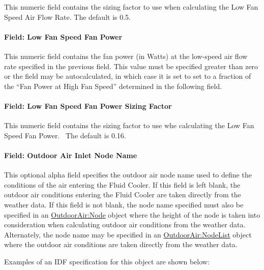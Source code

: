 This numeric field contains the sizing factor to use when calculating the Low Fan Speed Air Flow Rate. The default is 0.5.

\paragraph{Field: Low Fan Speed Fan Power}\label{field-low-fan-speed-fan-power-2}

This numeric field contains the fan power (in Watts) at the low-speed air flow rate specified in the previous field. This value must be specified greater than zero or the field may be autocalculated, in which case it is set to set to a fraction of the ``Fan Power at High Fan Speed'' determined in the following field.

\paragraph{Field: Low Fan Speed Fan Power Sizing Factor}\label{field-low-fan-speed-fan-power-sizing-factor-2}

This numeric field contains the sizing factor to use whe calculating the Low Fan Speed Fan Power.~ The default is 0.16.

\paragraph{Field: Outdoor Air Inlet Node Name}\label{field-outdoor-air-inlet-node-name-7}

This optional alpha field specifies the outdoor air node name used to define the conditions of the air entering the Fluid Cooler. If this field is left blank, the outdoor air conditions entering the Fluid Cooler are taken directly from the weather data. If this field is not blank, the node name specified must also be specified in an \hyperref[outdoorairnode]{OutdoorAir:Node} object where the height of the node is taken into consideration when calculating outdoor air conditions from the weather data. Alternately, the node name may be specified in an \hyperref[outdoorairnodelist]{\hyperref[outdoorairnode]{OutdoorAir:Node}List} object where the outdoor air conditions are taken directly from the weather data.

Examples of an IDF specification for this object are shown below:

